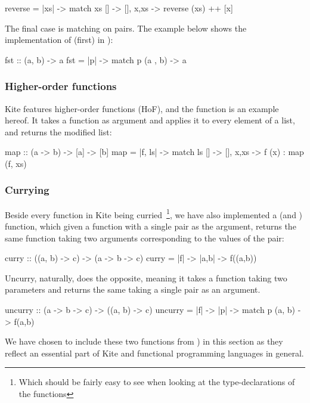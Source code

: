 \begin{kite}
reverse = |xs| -> {
  match xs {
    []    -> [],
    x,xs  -> reverse (xs) ++ [x]
  }
}
\end{kite}

The final case is matching on pairs. The example below shows the implementation of  (first) in ):
\begin{kite}
fst :: (a, b) -> a
fst = |p| -> {
  match p {
    (a , b) -> a
  }
}
\end{kite}

\subsubsection{Higher-order functions}
Kite features higher-order functions (HoF), and the  function is an example hereof. It takes a function as argument and applies it to every element of a list, and returns the modified list:

\begin{kite}
map :: (a -> b) -> [a] -> [b]
map = |f, ls| -> {
  match ls {
    [] -> [],
    x,xs -> f (x) : map (f, xs)
  }
}
\end{kite}

\subsubsection{Currying}
\label{subsubsec:currying}
Beside every function in Kite being curried~\footnote{Which should be fairly easy to see when looking at the type-declarations of the functions}, we have also implemented a  (and ) function, which given a function with a single pair as the argument, returns the same function taking two arguments corresponding to the values of the pair:

\begin{kite}
curry :: ((a, b) -> c) -> (a -> b -> c)
curry = |f| -> {
  |a,b| -> {
    f((a,b))
  }
}
\end{kite}

Uncurry, naturally, does the opposite, meaning it takes a function taking two parameters and returns the same taking a single pair as an argument.

\begin{kite}
uncurry :: (a -> b -> c) -> ((a, b) -> c)
uncurry = |f| -> {
  |p| -> {
    match p {
      (a, b) -> f(a,b)
    }
  }
}
\end{kite}

We have chosen to include these two functions from ) in this section as they reflect an essential part of Kite and functional programming languages in general.

